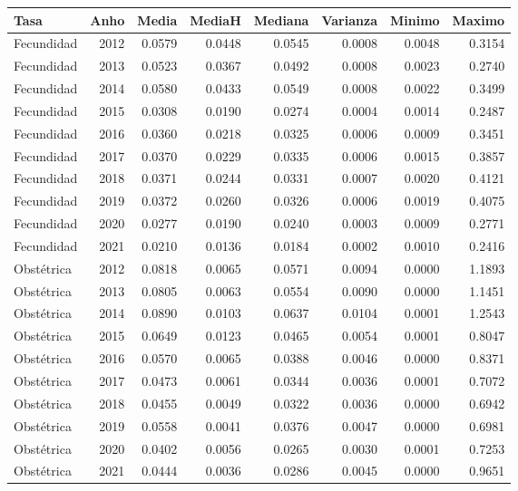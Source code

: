 
\begin{tabular}{lrrrrrrr}
\toprule
Tasa & Anho & Media & MediaH & Mediana & Varianza & Minimo & Maximo\\
\midrule
Fecundidad & 2012 & 0.0579 & 0.0448 & 0.0545 & 0.0008 & 0.0048 & 0.3154\\
Fecundidad & 2013 & 0.0523 & 0.0367 & 0.0492 & 0.0008 & 0.0023 & 0.2740\\
Fecundidad & 2014 & 0.0580 & 0.0433 & 0.0549 & 0.0008 & 0.0022 & 0.3499\\
Fecundidad & 2015 & 0.0308 & 0.0190 & 0.0274 & 0.0004 & 0.0014 & 0.2487\\
Fecundidad & 2016 & 0.0360 & 0.0218 & 0.0325 & 0.0006 & 0.0009 & 0.3451\\
\addlinespace
Fecundidad & 2017 & 0.0370 & 0.0229 & 0.0335 & 0.0006 & 0.0015 & 0.3857\\
Fecundidad & 2018 & 0.0371 & 0.0244 & 0.0331 & 0.0007 & 0.0020 & 0.4121\\
Fecundidad & 2019 & 0.0372 & 0.0260 & 0.0326 & 0.0006 & 0.0019 & 0.4075\\
Fecundidad & 2020 & 0.0277 & 0.0190 & 0.0240 & 0.0003 & 0.0009 & 0.2771\\
Fecundidad & 2021 & 0.0210 & 0.0136 & 0.0184 & 0.0002 & 0.0010 & 0.2416\\
\addlinespace
Obstétrica & 2012 & 0.0818 & 0.0065 & 0.0571 & 0.0094 & 0.0000 & 1.1893\\
Obstétrica & 2013 & 0.0805 & 0.0063 & 0.0554 & 0.0090 & 0.0000 & 1.1451\\
Obstétrica & 2014 & 0.0890 & 0.0103 & 0.0637 & 0.0104 & 0.0001 & 1.2543\\
Obstétrica & 2015 & 0.0649 & 0.0123 & 0.0465 & 0.0054 & 0.0001 & 0.8047\\
Obstétrica & 2016 & 0.0570 & 0.0065 & 0.0388 & 0.0046 & 0.0000 & 0.8371\\
\addlinespace
Obstétrica & 2017 & 0.0473 & 0.0061 & 0.0344 & 0.0036 & 0.0001 & 0.7072\\
Obstétrica & 2018 & 0.0455 & 0.0049 & 0.0322 & 0.0036 & 0.0000 & 0.6942\\
Obstétrica & 2019 & 0.0558 & 0.0041 & 0.0376 & 0.0047 & 0.0000 & 0.6981\\
Obstétrica & 2020 & 0.0402 & 0.0056 & 0.0265 & 0.0030 & 0.0001 & 0.7253\\
Obstétrica & 2021 & 0.0444 & 0.0036 & 0.0286 & 0.0045 & 0.0000 & 0.9651\\
\bottomrule
\end{tabular}